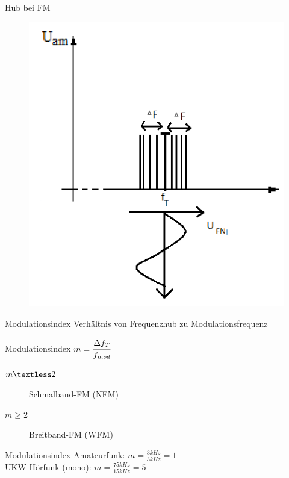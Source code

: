 \begin{frame}{Hub bei FM}
  \begin{center}
    \begin{figure}
      \includegraphics[width=\textwidth,height=.75\textheight,keepaspectratio]{e14/Hub.png}
    \end{figure}
  \end{center}
\end{frame}

\begin{frame}{Modulationsindex}
  Verhältnis von Frequenzhub zu Modulationsfrequenz
  \begin{block}{Modulationsindex}
    $m = \cfrac{\Delta f_T}{f_{mod}}$
  \end{block}
  \begin{description}
    \item[$m\textless2$] Schmalband-FM (NFM)
    \item[$m\geq$2] Breitband-FM (WFM)
  \end{description}
  \begin{exampleblock}{Modulationsindex}
    Amateurfunk: $m = \frac{3kHz}{3kHz} = 1$\\
    UKW-Hörfunk (mono): $m = \frac{75kHz}{15kHz} = 5$\\
  \end{exampleblock}
\end{frame}

